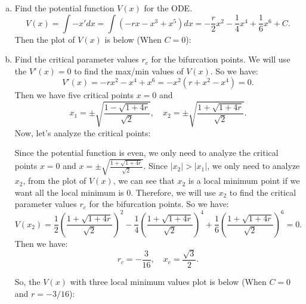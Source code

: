 \documentclass[12pt]{exam}
\begin{document}
\begin{enumerate}[(a)]
	\item Find the potential function $V(x)$ for the ODE.
	\[V(x)=\int -x'dx=\int (-rx-x^3+x^5)dx=-\frac{r}{2}x^2-\frac{1}{4}x^4+\frac{1}{6}x^6+C.\]
	Then the plot of $V(x)$ is below (When $C=0$):


	\item Find the critical parameter values $r_c$ for the bifurcation points. We will use the $V'(x)=0$ to find the max/min values of $V(x)$. So we have:
	\[V'(x)=-rx^2-x^4+x^6=-x^2(r+x^2-x^4)=0.\]
	Then we have five critical points $x=0$ and
	\[x_1=\pm \sqrt{\frac{1-\sqrt{1+4r}}{\sqrt{2}}}, \quad x_2=\pm \sqrt{\frac{1+\sqrt{1+4r}}{\sqrt{2}}}.\]
	Now, let's analyze the critical points:
	
	Since the potential function is even, we only need to analyze the critical points $x=0$ and $x=\pm \sqrt{\frac{1+\sqrt{1+4r}}{\sqrt{2}}}$. Since $|x_2|>|x_1|$, we only need to analyze $x_2$, from the plot of $V(x)$, we can see that $x_2$ is a local minimum point if we want all the local minimum is $0$. Therefore, we will use $x_2$ to find the critical parameter values $r_c$ for the bifurcation points. So we have:
	\[V(x_2)=\frac{1}{2}\left(\frac{1+\sqrt{1+4r}}{\sqrt{2}}\right)^2-\frac{1}{4}\left(\frac{1+\sqrt{1+4r}}{\sqrt{2}}\right)^4+\frac{1}{6}\left(\frac{1+\sqrt{1+4r}}{\sqrt{2}}\right)^6=0.\]
	Then we have:
	\[ r_c = -\frac{3}{16}, \quad x_c = \frac{\sqrt{3}}{2}.\]

	So, the $V(x)$ with three local minimum values plot is below (When $C=0$ and $r=-3/16$):


\end{enumerate}
\end{document}
